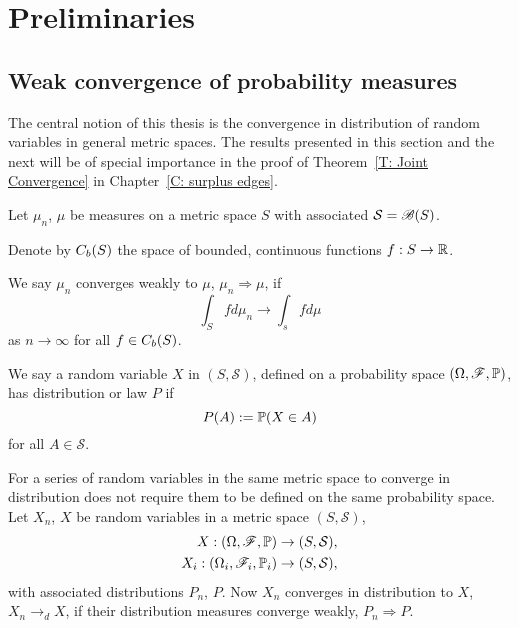 
\chapter{Preliminaries} \label{C: preliminaries}

\section{Weak convergence of probability measures} \label{S: weak convergence}

The central notion of this thesis is the convergence in distribution of random variables in general metric spaces.
The results presented in this section and the next will be of special importance in the proof of Theorem~\ref{T: Joint Convergence}
in Chapter~\ref{C: surplus edges}.

\begin{definition} \label{D: weak convergence}
	Let $\mu_n$, $\mu$ be measures on a metric space $S$ with associated \Bosi $\mathcal{S} = \mathscr{B}(S)$.
	
	Denote by $C_b(S)$ the space of bounded, continuous functions $f: S \rightarrow \mathbb{R}$.
	
	We say $\mu_n$ converges weakly to $\mu$, $\mu_n \Rightarrow \mu$, if
	\begin{equation}
		\int_S fd\mu_n \rightarrow \int_s fd\mu
	\end{equation}
	as $n \rightarrow \infty$ for all $f \in C_b(S)$.
\end{definition}

We say a random variable $X$ in $(S, \mathcal{S})$, 
defined on a probability space $(\Omega, \mathscr{F}, \mathbb{P})$,
has distribution or law $P$ if
\begin{equation}
	P(A) := \mathbb{P}(X \in A)
\end{equation}
for all $A \in \mathcal{S}$.

For a series of random variables in the same metric space to converge in distribution 
does not require them to be defined on the same probability space.
Let $X_n$, $X$ be random variables in a metric space $(S, \mathcal{S})$,
\begin{equation}
\begin{aligned}
	X: (\Omega, \mathscr{F}, \mathbb{P}) &\rightarrow (S, \mathcal{S}), \\
	X_i: (\Omega_i, \mathscr{F}_i, \mathbb{P}_i) &\rightarrow (S, \mathcal{S}),
\end{aligned}
\end{equation}
with associated distributions $P_n$, $P$.
Now $X_n$ converges in distribution to $X$, $X_n \rightarrow_d X$,
if their distribution measures converge weakly, $P_n \Rightarrow P$.

